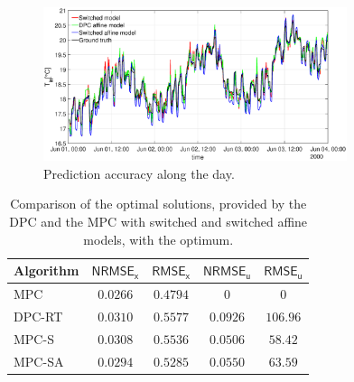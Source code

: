 \documentclass[letterpaper, 10 pt, conference]{ifacconf}  %
\begin{document}
\begin{figure}[t!]
	\centering
	\includegraphics[width=21pc]{figures/TemperatureTesting.eps}
	\caption{Prediction accuracy along the day.}
	\label{figTesting}
\end{figure}
\begin{table}[t!]
	\begin{center}
		\caption{Comparison of the optimal solutions, provided by the DPC and the MPC with switched and switched affine models, with the optimum.}
		\label{tabComparison}
		\begin{tabular}{lcccc}
			\toprule
			Algorithm & $\mathsf{NRMSE_{x}}$ & $\mathsf{RMSE_{x}}$ & $\mathsf{NRMSE_{u}}$ & $\mathsf{RMSE_{u}}$  \\    
			\midrule
			MPC       & $0.0266$             & $0.4794$ 		   & $0$      			  & $0$      			 \\
			DPC-RT    & $0.0310$             & $0.5577$ 		   & $0.0926$ 			  & $106.96$ 			 \\
			MPC-S     & $0.0308$             & $0.5536$ 		   & $0.0506$ 			  & $58.42$  			 \\
			MPC-SA    & $0.0294$             & $0.5285$ 		   & $0.0550$ 			  & $63.59$  			 \\
			\bottomrule
		\end{tabular}
	\end{center}
\end{table}
\end{document}
